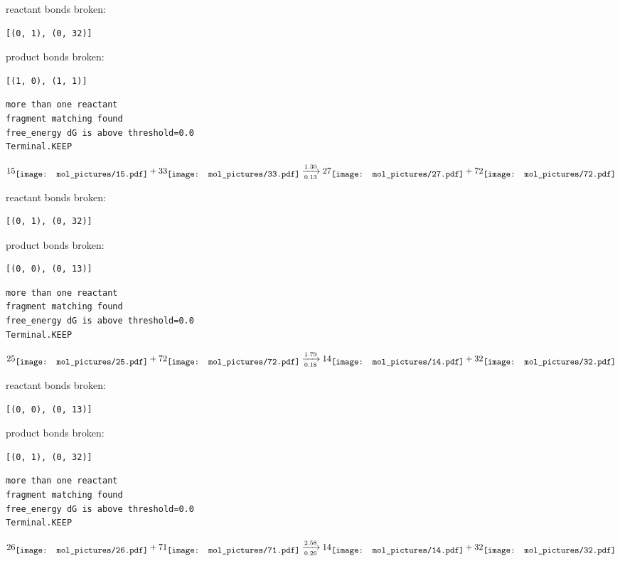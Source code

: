 \documentclass{article}
\begin{document}
reactant bonds broken:\begin{verbatim}
[(0, 1), (0, 32)]
\end{verbatim}
product bonds broken:\begin{verbatim}
[(1, 0), (1, 1)]
\end{verbatim}




\vspace{1cm}
\begin{verbatim}
more than one reactant
fragment matching found
free_energy dG is above threshold=0.0
Terminal.KEEP
\end{verbatim}
$$
15
\raisebox{-.5\height}{\texttt{[image: mol\_pictures/15.pdf]}}
+
33
\raisebox{-.5\height}{\texttt{[image: mol\_pictures/33.pdf]}}
\xrightarrow[0.13]{1.30}
27
\raisebox{-.5\height}{\texttt{[image: mol\_pictures/27.pdf]}}
+
72
\raisebox{-.5\height}{\texttt{[image: mol\_pictures/72.pdf]}}
$$


reactant bonds broken:\begin{verbatim}
[(0, 1), (0, 32)]
\end{verbatim}
product bonds broken:\begin{verbatim}
[(0, 0), (0, 13)]
\end{verbatim}




\vspace{1cm}
\begin{verbatim}
more than one reactant
fragment matching found
free_energy dG is above threshold=0.0
Terminal.KEEP
\end{verbatim}
$$
25
\raisebox{-.5\height}{\texttt{[image: mol\_pictures/25.pdf]}}
+
72
\raisebox{-.5\height}{\texttt{[image: mol\_pictures/72.pdf]}}
\xrightarrow[0.18]{1.79}
14
\raisebox{-.5\height}{\texttt{[image: mol\_pictures/14.pdf]}}
+
32
\raisebox{-.5\height}{\texttt{[image: mol\_pictures/32.pdf]}}
$$


reactant bonds broken:\begin{verbatim}
[(0, 0), (0, 13)]
\end{verbatim}
product bonds broken:\begin{verbatim}
[(0, 1), (0, 32)]
\end{verbatim}




\vspace{1cm}
\begin{verbatim}
more than one reactant
fragment matching found
free_energy dG is above threshold=0.0
Terminal.KEEP
\end{verbatim}
$$
26
\raisebox{-.5\height}{\texttt{[image: mol\_pictures/26.pdf]}}
+
71
\raisebox{-.5\height}{\texttt{[image: mol\_pictures/71.pdf]}}
\xrightarrow[0.26]{2.58}
14
\raisebox{-.5\height}{\texttt{[image: mol\_pictures/14.pdf]}}
+
32
\raisebox{-.5\height}{\texttt{[image: mol\_pictures/32.pdf]}}
$$
\end{document}
